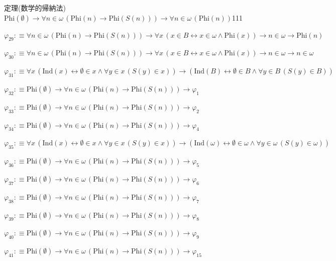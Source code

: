 \begin{fullproof}{定理(数学的帰納法)}{$\mathrm{Phi}(\emptyset) \to \forall n \in \omega\,(\mathrm{Phi}(n) \to \mathrm{Phi}(S(n))) \to \forall n \in \omega\,(\mathrm{Phi}(n))$}{111}
\begin{abbrevlist}
\item $\varphi_{29} :\equiv \forall n \in \omega\,(\mathrm{Phi}(n) \to \mathrm{Phi}(S(n))) \to \forall x\,(x \in B \leftrightarrow x \in \omega \land \mathrm{Phi}(x)) \to n \in \omega \to \mathrm{Phi}(n)$
\item $\varphi_{30} :\equiv \forall n \in \omega\,(\mathrm{Phi}(n) \to \mathrm{Phi}(S(n))) \to \forall x\,(x \in B \leftrightarrow x \in \omega \land \mathrm{Phi}(x)) \to n \in \omega \to n \in \omega$
\item $\varphi_{31} :\equiv \forall x\,(\mathrm{Ind}(x) \leftrightarrow \emptyset \in x \land \forall y \in x\,(S(y) \in x)) \to (\mathrm{Ind}(B) \leftrightarrow \emptyset \in B \land \forall y \in B\,(S(y) \in B))$
\item $\varphi_{32} :\equiv \mathrm{Phi}(\emptyset) \to \forall n \in \omega\,(\mathrm{Phi}(n) \to \mathrm{Phi}(S(n))) \to \varphi_{1}$
\item $\varphi_{33} :\equiv \mathrm{Phi}(\emptyset) \to \forall n \in \omega\,(\mathrm{Phi}(n) \to \mathrm{Phi}(S(n))) \to \varphi_{2}$
\item $\varphi_{34} :\equiv \mathrm{Phi}(\emptyset) \to \forall n \in \omega\,(\mathrm{Phi}(n) \to \mathrm{Phi}(S(n))) \to \varphi_{4}$
\item $\varphi_{35} :\equiv \forall x\,(\mathrm{Ind}(x) \leftrightarrow \emptyset \in x \land \forall y \in x\,(S(y) \in x)) \to (\mathrm{Ind}(\omega) \leftrightarrow \emptyset \in \omega \land \forall y \in \omega\,(S(y) \in \omega))$
\item $\varphi_{36} :\equiv \mathrm{Phi}(\emptyset) \to \forall n \in \omega\,(\mathrm{Phi}(n) \to \mathrm{Phi}(S(n))) \to \varphi_{5}$
\item $\varphi_{37} :\equiv \mathrm{Phi}(\emptyset) \to \forall n \in \omega\,(\mathrm{Phi}(n) \to \mathrm{Phi}(S(n))) \to \varphi_{6}$
\item $\varphi_{38} :\equiv \mathrm{Phi}(\emptyset) \to \forall n \in \omega\,(\mathrm{Phi}(n) \to \mathrm{Phi}(S(n))) \to \varphi_{7}$
\item $\varphi_{39} :\equiv \mathrm{Phi}(\emptyset) \to \forall n \in \omega\,(\mathrm{Phi}(n) \to \mathrm{Phi}(S(n))) \to \varphi_{8}$
\item $\varphi_{40} :\equiv \mathrm{Phi}(\emptyset) \to \forall n \in \omega\,(\mathrm{Phi}(n) \to \mathrm{Phi}(S(n))) \to \varphi_{9}$
\item $\varphi_{41} :\equiv \mathrm{Phi}(\emptyset) \to \forall n \in \omega\,(\mathrm{Phi}(n) \to \mathrm{Phi}(S(n))) \to \varphi_{15}$

\end{abbrevlist}
\end{fullproof}
